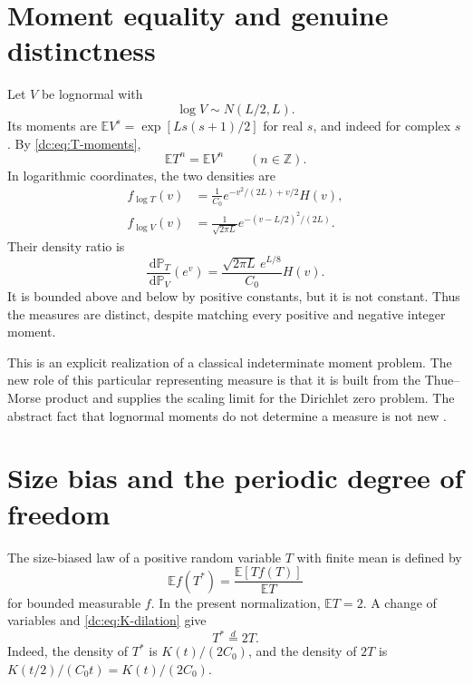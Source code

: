 \documentclass[11pt,a4paper,oneside,openany]{book}
\numberwithin{equation}{chapter}
\theoremstyle{definition}
\theoremstyle{remark}
\newcommand{\Z}{\mathbb Z}
\newcommand{\E}{\mathbb E}
\newcommand{\dd}{\,\mathrm d}
\begin{document}
\section{Moment equality and genuine distinctness}
Let $V$ be lognormal with
\begin{equation}
 \log V\sim N(L/2,L).
 \label{dc:eq:lognormal}
\end{equation}
Its moments are
$\E V^s=\exp[Ls(s+1)/2]$ for real $s$, and indeed for complex $s$.
By \cref{dc:eq:T-moments},
\begin{equation}
 \E T^n=\E V^n\qquad(n\in\Z).
 \label{dc:eq:integer-twins}
\end{equation}
In logarithmic coordinates, the two densities are
\begin{align}
 f_{\log T}(v)
 &=\frac1{C_0}e^{-v^2/(2L)+v/2}H(v),
 \label{dc:eq:T-log-density}\\
 f_{\log V}(v)
 &=\frac1{\sqrt{2\pi L}}e^{-(v-L/2)^2/(2L)}.
 \label{dc:eq:V-log-density}
\end{align}
Their density ratio is
\begin{equation}
 \frac{\dd\mathbb P_T}{\dd\mathbb P_V}(e^v)
 =\frac{\sqrt{2\pi L}\,e^{L/8}}{C_0}H(v).
 \label{dc:eq:density-ratio}
\end{equation}
It is bounded above and below by positive constants, but it is not
constant. Thus the measures are distinct, despite matching every
positive and negative integer moment.

This is an explicit realization of a classical indeterminate moment
problem. The new role of this particular representing measure is
that it is built from the Thue--Morse product and supplies the
scaling limit for the Dirichlet zero problem. The abstract fact that
lognormal moments do not determine a measure is not new
\cite[Section 9]{agk}.

\section{Size bias and the periodic degree of freedom}
The size-biased law of a positive random variable $T$ with finite
mean is defined by
\[
 \E f(T^*)=\frac{\E[Tf(T)]}{\E T}
\]
for bounded measurable $f$. In the present normalization, $\E T=2$.
A change of variables and \cref{dc:eq:K-dilation} give
\begin{equation}
 T^*\overset{d}=2T.
 \label{dc:eq:size-bias}
\end{equation}
Indeed, the density of $T^*$ is $K(t)/(2C_0)$, and the density of
$2T$ is $K(t/2)/(C_0t)=K(t)/(2C_0)$.
\end{document}
